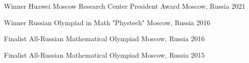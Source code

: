 



\begin{cvhonors}

  \cvhonor
  {Winner} %
  {Huawei Moscow Research Center President Award} %
  {Moscow, Russia} %
  {2021} %

  \cvhonor
  {Winner} %
  {Russian Olympiad in Math "Phystech"} %
  {Moscow, Russia} %
  {2016} %

  \cvhonor
  {Finalist} %
  {All-Russian Mathematical Olympiad} %
  {Moscow, Russia} %
  {2016} %

  \cvhonor
  {Finalist} %
  {All-Russian Mathematical Olympiad} %
  {Moscow, Russia} %
  {2015} %
\end{cvhonors}







